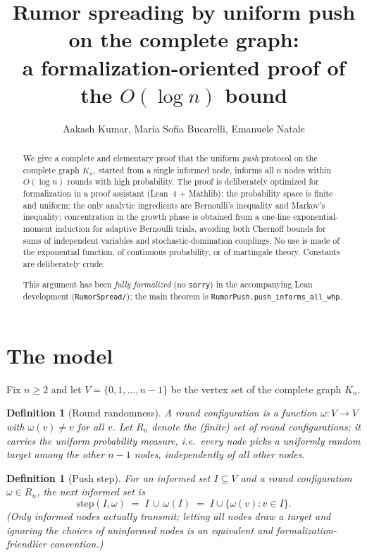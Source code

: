 \documentclass[11pt]{article}
\title{Rumor spreading by uniform push on the complete graph:\\
a formalization-oriented proof of the $O(\log n)$ bound}
\author{Aakash Kumar, Maria Sofia Bucarelli, Emanuele Natale}
\date{}
\newtheorem{definition}[theorem]{Definition}
\begin{document}
\maketitle

\begin{abstract}
\noindent
We give a complete and elementary proof that the uniform \emph{push} protocol
on the complete graph $K_n$, started from a single informed node, informs all
$n$ nodes within $O(\log n)$ rounds with high probability.  The proof is
deliberately optimized for formalization in a proof assistant (Lean~4 +
Mathlib): the probability space is finite and uniform; the only analytic
ingredients are Bernoulli's inequality and Markov's inequality; concentration
in the growth phase is obtained from a one-line exponential-moment induction
for adaptive Bernoulli trials, avoiding both Chernoff bounds for sums of
independent variables and stochastic-domination couplings.  No use is made of
the exponential function, of continuous probability, or of martingale theory.
Constants are deliberately crude.

\smallskip
\noindent
This argument has been \emph{fully formalized} (no \texttt{sorry}) in the
accompanying Lean development (\texttt{RumorSpread/}); the main theorem is
\texttt{RumorPush.push\_informs\_all\_whp}.
\end{abstract}

\section{The model}\label{sec:model}

Fix $n \ge 2$ and let $V = \{0,1,\dots,n-1\}$ be the vertex set of the
complete graph $K_n$.

\begin{definition}[Round randomness]\label{def:round}
A \emph{round configuration} is a function
$\omega \colon V \to V$ with $\omega(v) \ne v$ for all $v$.
Let $R_n$ denote the (finite) set of round configurations; it carries the
uniform probability measure, i.e.\ every node picks a uniformly random
\emph{target} among the other $n-1$ nodes, independently of all other nodes.
\end{definition}

\begin{definition}[Push step]\label{def:step}
For an \emph{informed set} $I \subseteq V$ and a round configuration
$\omega \in R_n$, the next informed set is
\[
  \mathrm{step}(I,\omega) \;=\; I \,\cup\, \omega(I)
  \;=\; I \cup \{\omega(v) : v \in I\}.
\]
(Only informed nodes actually transmit; letting \emph{all} nodes draw a target
and ignoring the choices of uninformed nodes is an equivalent and
formalization-friendlier convention.)
\end{definition}
\end{document}
